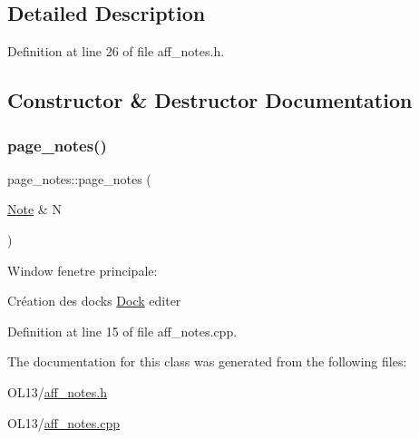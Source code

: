\subsection{Detailed Description}


Definition at line 26 of file aff\+\_\+notes.\+h.



\subsection{Constructor \& Destructor Documentation}
\mbox{\label{classpage__notes_ad9a1b3dbe6c7901ed37a5784b1094fa6}} 
\subsubsection{\texorpdfstring{page\+\_\+notes()}{page\_notes()}}
{\footnotesize\ttfamily page\+\_\+notes\+::page\+\_\+notes (\begin{DoxyParamCaption}\item[{\hyperlink{class_note}{Note} \&}]{N }\end{DoxyParamCaption})}

Window fenetre principale\+:

Création des docks \hyperlink{class_dock}{Dock} editer

Definition at line 15 of file aff\+\_\+notes.\+cpp.



The documentation for this class was generated from the following files\+:\begin{DoxyCompactItemize}
\item 
O\+L13/\hyperlink{aff__notes_8h}{aff\+\_\+notes.\+h}\item 
O\+L13/\hyperlink{aff__notes_8cpp}{aff\+\_\+notes.\+cpp}\end{DoxyCompactItemize}
